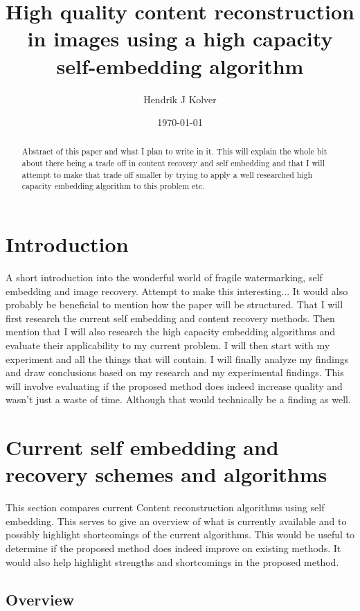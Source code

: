\documentclass[11pt]{article}
\title{High quality content reconstruction in images using a high capacity self-embedding algorithm}
\author{Hendrik J Kolver}
\date{\today}
\begin{document}
\maketitle

\begin{abstract}

\noindent Abstract of this paper and what I plan to write in it.
This will explain the whole bit about there being a trade off in content recovery and self embedding and that I will attempt to make that trade off smaller by trying to apply a well researched high capacity embedding algorithm to this problem etc.

\end{abstract}

\section{Introduction}
A short introduction into the wonderful world of fragile watermarking, self embedding and image recovery. Attempt to make this interesting...
It would also probably be beneficial to mention how the paper will be structured. 
That I will first research the current self embedding and content recovery methods. 
Then mention that I will also research the high capacity embedding algorithms and evaluate their applicability to my current problem. 
I will then start with my experiment and all the things that will contain. 
I will finally analyze my findings and draw conclusions based on my research and my experimental findings. 
This will involve evaluating if the proposed method does indeed increase quality and wasn't just a waste of time. 
Although that would technically be a finding as well. 

\section{Current self embedding and recovery schemes and algorithms}

This section compares current Content reconstruction algorithms using self embedding.
This serves to give an overview of what is currently available and to possibly highlight shortcomings of the current algorithms.
This would be useful to determine if the proposed method does indeed improve on existing methods. 
It would also help highlight strengths and shortcomings in the proposed method.

\subsection{Overview}
\end{document}
